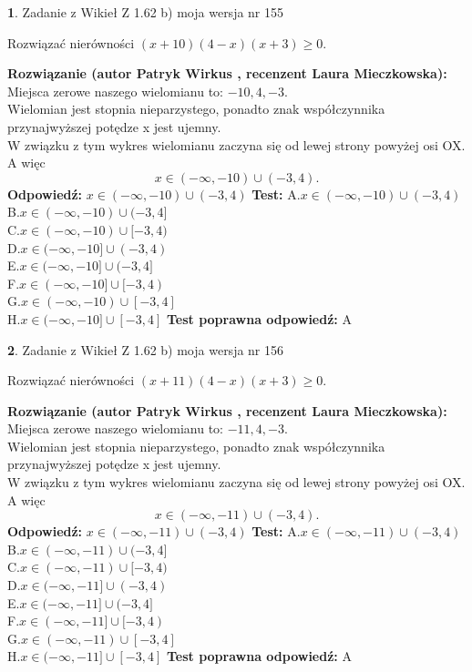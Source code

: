 \documentclass[12pt, a4paper]{article}
\theoremstyle{definition} %
\newtheorem{zad}{}
\newcommand{\zadStart}[1]{\begin{zad}#1\newline}
\newcommand{\zadStop}{\end{zad}}
\newcommand{\rozwStart}[2]{\noindent \textbf{Rozwiązanie (autor #1 , recenzent #2): }\newline}
\newcommand{\rozwStop}{\newline}
\newcommand{\odpStart}{\noindent \textbf{Odpowiedź:}\newline}
\newcommand{\odpStop}{\newline}
\newcommand{\testStart}{\noindent \textbf{Test:}\newline}
\newcommand{\testStop}{\newline}
\newcommand{\kluczStart}{\noindent \textbf{Test poprawna odpowiedź:}\newline}
\newcommand{\kluczStop}{\newline}
\begin{document}
\zadStart{Zadanie z Wikieł Z 1.62 b) moja wersja nr 155}

Rozwiązać nierówności $(x+10)(4-x)(x+3)\ge0$.
\zadStop
\rozwStart{Patryk Wirkus}{Laura Mieczkowska}
Miejsca zerowe naszego wielomianu to: $-10, 4, -3$.\\
Wielomian jest stopnia nieparzystego, ponadto znak współczynnika przy\linebreak najwyższej potędze x jest ujemny.\\ W związku z tym wykres wielomianu zaczyna się od lewej strony powyżej osi OX. A więc $$x \in (-\infty,-10) \cup (-3,4).$$
\rozwStop
\odpStart
$x \in (-\infty,-10) \cup (-3,4)$
\odpStop
\testStart
A.$x \in (-\infty,-10) \cup (-3,4)$\\
B.$x \in (-\infty,-10) \cup (-3,4]$\\
C.$x \in (-\infty,-10) \cup [-3,4)$\\
D.$x \in (-\infty,-10] \cup (-3,4)$\\
E.$x \in (-\infty,-10] \cup (-3,4]$\\
F.$x \in (-\infty,-10] \cup [-3,4)$\\
G.$x \in (-\infty,-10) \cup [-3,4]$\\
H.$x \in (-\infty,-10] \cup [-3,4]$
\testStop
\kluczStart
A
\kluczStop



\zadStart{Zadanie z Wikieł Z 1.62 b) moja wersja nr 156}

Rozwiązać nierówności $(x+11)(4-x)(x+3)\ge0$.
\zadStop
\rozwStart{Patryk Wirkus}{Laura Mieczkowska}
Miejsca zerowe naszego wielomianu to: $-11, 4, -3$.\\
Wielomian jest stopnia nieparzystego, ponadto znak współczynnika przy\linebreak najwyższej potędze x jest ujemny.\\ W związku z tym wykres wielomianu zaczyna się od lewej strony powyżej osi OX. A więc $$x \in (-\infty,-11) \cup (-3,4).$$
\rozwStop
\odpStart
$x \in (-\infty,-11) \cup (-3,4)$
\odpStop
\testStart
A.$x \in (-\infty,-11) \cup (-3,4)$\\
B.$x \in (-\infty,-11) \cup (-3,4]$\\
C.$x \in (-\infty,-11) \cup [-3,4)$\\
D.$x \in (-\infty,-11] \cup (-3,4)$\\
E.$x \in (-\infty,-11] \cup (-3,4]$\\
F.$x \in (-\infty,-11] \cup [-3,4)$\\
G.$x \in (-\infty,-11) \cup [-3,4]$\\
H.$x \in (-\infty,-11] \cup [-3,4]$
\testStop
\kluczStart
A
\kluczStop
\end{document}
